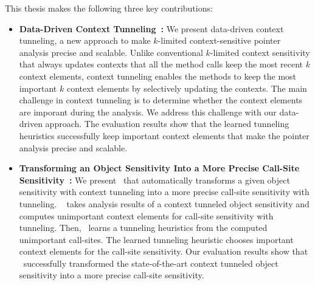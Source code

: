 


This thesis makes the following three key contributions:



\begin{itemize}
\item {\bf Data-Driven Context Tunneling~\cite{JeJeOh18}:}
We present data-driven context tunneling, a new approach to make $k$-limited context-sensitive pointer analysis precise and scalable.
Unlike conventional $k$-limited context sensitivity that always updates contexts that all the method calls keep the most recent $k$ context elements, context tunneling enables the methods to keep the most important $k$ context elements by selectively updating the contexts.
The main challenge in context tunneling is to determine whether the context elements are imporant during the analysis. We address this challenge with our data-driven approach. The evaluation results show that the learned tunneling heuristics successfully keep important context elements that make the pointer analysis precise and scalable.


\item {\bf Transforming an Object Sensitivity Into a More Precise Call-Site Sensitivity~\cite{JeOh22}:}
We present \ourtechnique~that automatically transforms a given object sensitivity with context tunneling into a more precise call-site sensitivity with tunneling. 
\ourtechnique~ takes analysis results of a context tunneled object sensitivity and computes unimportant context elements for call-site sensitivity with tunneling. 
Then, \ourtechnique~learns a tunneling heuristics from the computed unimportant call-sites. The learned tunneling heuristic chooses important context elements for the call-site sensitivity. Our evaluation results show that \ourtechnique~successfully transformed the state-of-the-art context tunneled object sensitivity into a more precise call-site sensitivity. 




\end{itemize}
